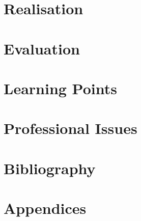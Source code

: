 \documentclass{article}
\begin{document}
	\section{Realisation}
	
	\section{Evaluation}
	
	\section{Learning Points}
	
	\section{Professional Issues}
	
	\section{Bibliography}
	
		
		
	
	\section{Appendices}
		
\end{document}
